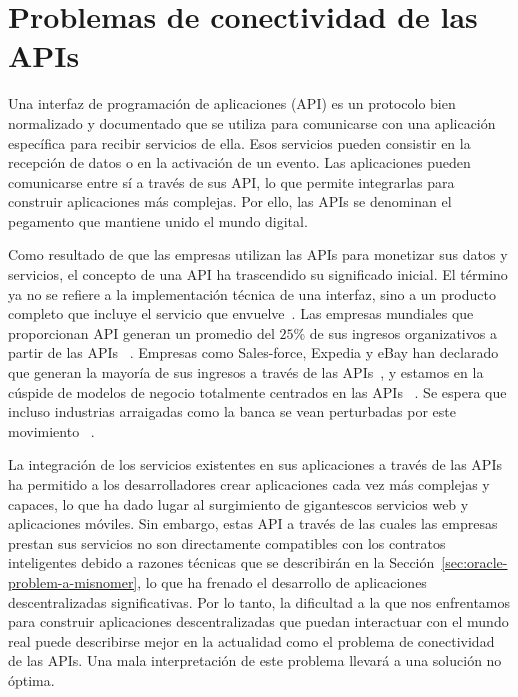 \documentclass[11pt]{article}
\begin{document}
\section{Problemas de conectividad de las APIs}
\label{sec:api-connectivity-problem}

Una interfaz de programación de aplicaciones (API) es un protocolo bien normalizado y documentado que se utiliza para comunicarse con una aplicación específica para recibir servicios de ella. Esos servicios pueden consistir en la recepción de datos o en la activación de un evento. Las aplicaciones pueden comunicarse entre sí a través de sus API, lo que permite integrarlas para construir aplicaciones más complejas. Por ello, las APIs se denominan el pegamento que mantiene unido el mundo digital.

Como resultado de que las empresas utilizan las APIs para monetizar sus datos y servicios, el concepto de una API ha trascendido su significado inicial. El término ya no se refiere a la implementación técnica de una interfaz, sino a un producto completo que incluye el servicio que envuelve~\cite{deloitte:2015}.
Las empresas mundiales que proporcionan API generan un promedio del $25\%$ de sus ingresos organizativos a partir de las APIs ~\cite{mulesoft:2019}.
Empresas como Sales-force, Expedia y eBay han declarado que generan la mayoría de sus ingresos a través de las APIs~\cite{iyer:2015},
y estamos en la cúspide de modelos de negocio totalmente centrados en las APIs ~\cite{ibm:2016}.
Se espera que incluso industrias arraigadas como la banca se vean perturbadas por este movimiento ~\cite{capgemini:2019a}.

La integración de los servicios existentes en sus aplicaciones a través de las APIs ha permitido a los desarrolladores crear aplicaciones cada vez más complejas y capaces, lo que ha dado lugar al surgimiento de gigantescos servicios web y aplicaciones móviles. Sin embargo, estas API a través de las cuales las empresas prestan sus servicios no son directamente compatibles con los contratos inteligentes debido a razones técnicas que se describirán en la Sección~\ref{sec:oracle-problem-a-misnomer}, lo que ha frenado el desarrollo de aplicaciones descentralizadas significativas. Por lo tanto, la dificultad a la que nos enfrentamos para construir aplicaciones descentralizadas que puedan interactuar con el mundo real puede describirse mejor en la actualidad como el problema de conectividad de las APIs. Una mala interpretación de este problema llevará a una solución no óptima.
\end{document}
